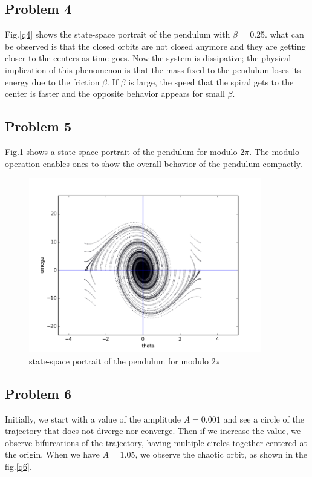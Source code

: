 \documentclass{article}
\begin{document}
\subsection*{Problem 4}
Fig.\ref{q4} shows the state-space portrait of the pendulum with $\beta$ = 0.25. what can be observed is that the closed orbits are not closed anymore and they are getting closer to the centers as time goes. Now the system is dissipative; the physical implication of this phenomenon is that the mass fixed to the pendulum loses its energy due to the friction $\beta$. If $\beta$ is large, the speed that the spiral gets to the center is faster and the opposite behavior appears for small $\beta$.

\subsection*{Problem 5}
Fig.\ref{q5} shows a state-space portrait of the pendulum for modulo $2\pi$. The modulo operation enables ones to show the overall behavior of the pendulum compactly.
\begin{figure}
  \centering
  \includegraphics[height=3in]{figs/Q5_modified.png}
  \caption{state-space portrait of the pendulum for modulo $2\pi$}
  \label{q5}
\end{figure}

\subsection*{Problem 6}
Initially, we start with a value of the amplitude $A = 0.001$ and see a circle of the trajectory that does not diverge nor converge. Then if we increase the value, we observe  bifurcations of the trajectory, having multiple circles together centered at the origin. When we have $A = 1.05$, we observe the chaotic orbit, as shown in the fig.\ref{q6}.
\end{document}
